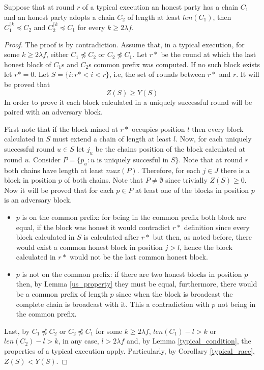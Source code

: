 \documentclass[..]{subfiles}
\begin{document}
\begin{lemma}\label{cp_lemma}
	Suppose that at round $r$ of a typical execution an honest party has a chain $C_1$ and an honest party adopts a chain $C_2$ of length at least $len(C_1)$, then $C_1^{\lceil k} \preceq C_2$ and $C_2^{\lceil k} \preceq C_1$ for every $k \ge 2\lambda f$. 
\end{lemma}
\begin{proof}
	The proof is by contradiction. Assume that, in a typical execution, for some $k \ge 2\lambda f$, either $C_1 \npreceq C_2$ or $C_2 \npreceq C_1$. Let $r*$ be the round at which the last honest block of $C_1$s and $C_2$s common prefix was computed. If no such block exists let $r*=0$. Let $S = \{i : r* < i < r\}$, i.e, the set of rounds between $r* $ and $r$. It will be proved that
	$$Z(S) \ge Y(S)$$
	In order to prove it each block calculated in a uniquely successful round will be paired with an adversary block.
	
	First note that if the block mined at $r*$ occupies position $l$ then every block calculated in $S$ must extend a chain of length at least $l$. Now, for each uniquely successful round $u \in S$ let $j_u$ be the chains position of the block calculated at round $u$. Consider $P = \{p_u : u \textrm{ is uniquely succesful in } S\}$. Note that at round $r$ both chains have length at least $max(P)$. Therefore, for each $j \in J$ there is a block in position $p$ of both chains. Note that $P \neq \emptyset$ since trivially $Z(S)\ge0$. Now it will be proved that for each $p \in P$ at least one of the blocks in position $p$ is an adversary block.
	\begin{itemize}
		\item $p$ is on the common prefix: for being in the common prefix both block are equal, if the block was honest it would contradict $r*$ definition since every block calculated in $S$ is calculated after $r*$ but then, as noted before, there would exist a common honest block in position $j>l$, hence the block calculated in $r*$ would not be the last common honest block.
		\item $p$ is not on the common prefix: if there are two honest blocks in position $p$ then, by Lemma \ref{us_property} they must be equal, furthermore, there would be a common prefix of length $p$ since when the block is broadcast the complete chain is broadcast with it. This a contradiction with $p$ not being in the common prefix.
	\end{itemize}
	Last, by $C_1 \npreceq C_2$ or $C_2 \npreceq C_1$ for some $k \ge 2\lambda f$, $len(C_1) - l > k$ or $len(C_2) - l > k$, in any case, $l > 2\lambda f$ and, by Lemma \ref{typical_condition}, the properties of a typical execution apply. Particularly, by Corollary \ref{typical_race}, $Z(S) < Y(S)$.
\end{proof}
\end{document}
